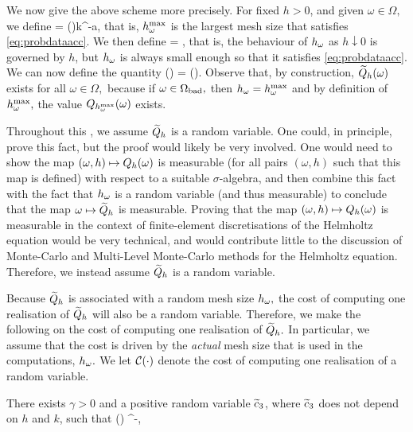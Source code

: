 We now give the above scheme more precisely. For fixed $h>0$, and given $\omega \in \Omega,$ we define
\beq\label{eq:hmaxomega}
\hmaxomega = \Co(\omega)k^{-a},
\eeq
that is, $h^{\max}_{\omega}$ is the largest mesh size that satisfies \cref{eq:probdataacc}. We then define
\beq\label{eq:homega}
\homega = \min{},
\eeq
that is, the behaviour of $h_{\omega}$ as $h\downarrow 0$ is governed by $h$, but $h_{\omega}$ is always small enough so that it satisfies \cref{eq:probdataacc}. We can now define the quantity
\beq\label{eq:Qhtilde}
\Qhtilde(\omega) = \Qhomega(\omega).
\eeq
Observe that, by construction, $\widetilde{Q}_{h}(\omega)$ exists for all $\omega \in \Omega,$ because if $\omega \in \Omega_{\mathrm{bad}},$ then $h_{\omega} = h^{\max}_{\omega}$ and by definition of $h^{\max}_{\omega},$ the value $Q_{h^{\max}_{\omega}}(\omega)$ exists.

\label{rem:Qhtilderandom}
Throughout this , we assume $\widetilde{Q}_{h}$ is a random variable. One could, in principle, prove this fact, but the proof would likely be very involved. One would need to show the map $(\omega,h) \mapsto Q_{h}(\omega)$ is measurable (for all pairs $(\omega,h)$ such that this map is defined) with respect to a suitable $\sigma$-algebra, and then combine this fact with the fact that $h_{\omega}$ is a random variable (and thus measurable) to conclude that the map $\omega \mapsto \widetilde{Q}_{h}$ is measurable. Proving that the map $(\omega,h) \mapsto Q_{h}(\omega)$ is measurable in the context of finite-element discretisations of the Helmholtz equation would be very technical, and would contribute little to the discussion of Monte-Carlo and Multi-Level Monte-Carlo methods for the Helmholtz equation. Therefore, we instead assume $\widetilde{Q}_{h}$ is a random variable.
\ere

Because $\widetilde{Q}_{h}$ is associated with a random mesh size $h_{\omega},$ the cost of computing one realisation of $\widetilde{Q}_{h}$ will also be a random variable. Therefore, we make the following  on the cost of computing one realisation of $\widetilde{Q}_{h}.$ In particular, we assume that the cost is driven by the \emph{actual} mesh size that is used in the computations, $h_{\omega}.$ We let $\Cost{\cdot}$ denote the cost of computing one realisation of a random variable.

\label{ass:costone}
There exists $ \gamma > 0$ and a positive random variable $\widetilde{c}_{3}$, where $\widetilde{c}_{3}$ does not depend on $h$ and $k$, such that
\beqs
\Cost{\Qhtilde(\omega)} \leq \cthtilde(\omega) \homega^{-\gamma},
\eeqs
\eas

